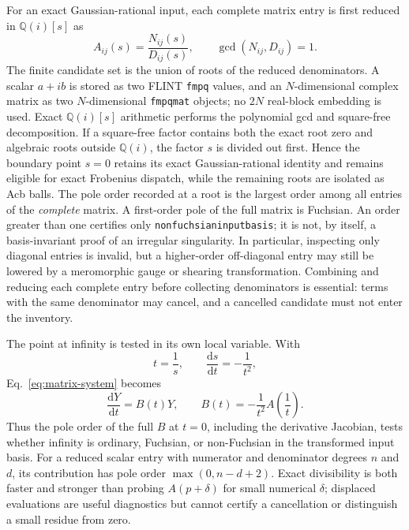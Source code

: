 \documentclass[11pt]{article}
\newcommand{\dd}{\mathrm d}
\renewcommand{\_}{\origunderscore\allowbreak}
\begin{document}
For an exact Gaussian-rational input, each complete matrix entry is first reduced in
$\mathbb Q(i)[s]$ as
\begin{equation}
 A_{ij}(s)=\frac{N_{ij}(s)}{D_{ij}(s)},
 \qquad \gcd(N_{ij},D_{ij})=1.
\end{equation}
The finite candidate set is the union of roots of the reduced denominators.  A scalar
$a+ib$ is stored as two FLINT \texttt{fmpq} values, and an $N$-dimensional complex matrix as
two $N$-dimensional \texttt{fmpq\_mat} objects; no $2N$ real-block embedding is used.  Exact
$\mathbb Q(i)[s]$ arithmetic performs the polynomial gcd and square-free decomposition.  If a
square-free factor contains both the exact root zero and algebraic roots outside
$\mathbb Q(i)$, the factor $s$ is divided out first.  Hence the boundary point $s=0$ retains
its exact Gaussian-rational identity and remains eligible for exact Frobenius dispatch, while
the remaining roots are isolated as Acb balls.  The pole order recorded at a root is
the largest order among all entries of the \emph{complete} matrix.  A first-order pole of the
full matrix is Fuchsian.  An order greater than one certifies only
\texttt{non\_fuchsian\_input\_basis}; it is not, by itself, a basis-invariant proof of an
irregular singularity.  In particular, inspecting only diagonal entries is invalid, but a
higher-order off-diagonal entry may still be lowered by a meromorphic gauge or shearing
transformation.  Combining and reducing each complete entry before collecting denominators
is essential: terms with the same denominator may cancel, and a cancelled candidate must
not enter the inventory.

The point at infinity is tested in its own local variable.  With
\begin{equation}
 t=\frac{1}{s},\qquad \frac{\dd s}{\dd t}=-\frac{1}{t^2},
\end{equation}
Eq.~\eqref{eq:matrix-system} becomes
\begin{equation}
 \frac{\dd Y}{\dd t}=B(t)Y,
 \qquad B(t)=-\frac{1}{t^2}A\!\left(\frac{1}{t}\right).
 \label{eq:infinity-transform}
\end{equation}
Thus the pole order of the full $B$ at $t=0$, including the derivative Jacobian, tests
whether infinity is ordinary, Fuchsian, or non-Fuchsian in the transformed input basis.
For a reduced scalar entry with numerator and denominator degrees $n$ and $d$, its
contribution has pole order $\max(0,n-d+2)$.  Exact divisibility is both faster and stronger
than probing $A(p+\delta)$ for small numerical $\delta$; displaced evaluations are useful
diagnostics but cannot certify a cancellation or distinguish a small residue from zero.
\end{document}
